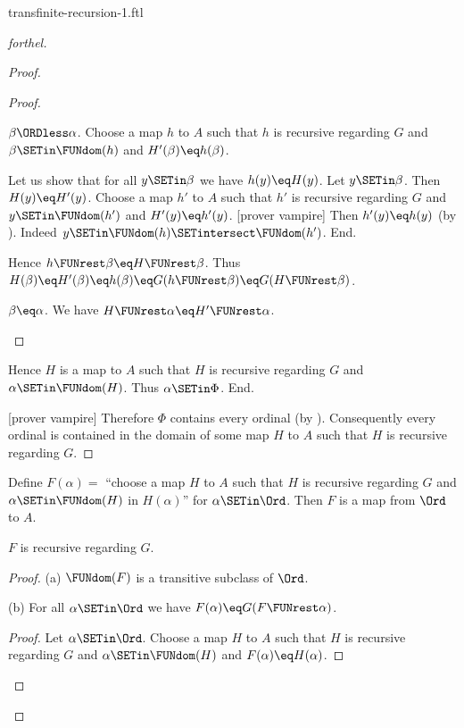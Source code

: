 \documentclass{naproche-library}
\begin{document}
\begin{smodule}[title=Transfinite Recursion I]{transfinite-recursion-1.ftl}
\begin{proof}[forthel]
\begin{proof}
\begin{proof}
        \begin{case}{$\beta \ORDless \alpha$.}
          Choose a map $h$ to $A$ such that $h$ is recursive regarding $G$ and $\beta \SETin \FUNdom(h)$ and $H'(\beta) \eq h(\beta)$.

          Let us show that for all $y \SETin \beta$ we have $h(y) \eq H(y)$.
            Let $y \SETin \beta$.
            Then $H(y) \eq H'(y)$.
            Choose a map $h'$ to $A$ such that $h'$ is recursive regarding $G$ and $y \SETin \FUNdom(h')$ and $H'(y) \eq h'(y)$.
            [prover vampire]
            Then $h'(y) \eq h(y)$ (by ).
            Indeed $y \SETin \FUNdom(h) \SETintersect \FUNdom(h')$.
          End.

          Hence $h \FUNrest \beta \eq H \FUNrest \beta$.
          Thus $H(\beta)
            \eq H'(\beta)
            \eq h(\beta)
            \eq G(h \FUNrest \beta)
            \eq G(H \FUNrest \beta)$.
        \end{case}

        \begin{case}{$\beta \eq \alpha$.}
          We have $H \FUNrest \alpha \eq H' \FUNrest \alpha$.
        \end{case}
      \end{proof}

      Hence $H$ is a map to $A$ such that $H$ is recursive regarding $G$ and $\alpha \SETin \FUNdom(H)$.
      Thus $\alpha \SETin \Phi$.
    End.

    [prover vampire]
    Therefore $\Phi$ contains every ordinal (by ).
    Consequently every ordinal is contained in the domain of some map $H$ to $A$ such that $H$ is recursive regarding $G$.
  \end{proof}

  Define $F(\alpha) =$ ``choose a map $H$ to $A$ such that $H$ is recursive regarding $G$ and $\alpha \SETin \FUNdom(H)$ in $H(\alpha)$'' for $\alpha \SETin \Ord$.
  Then $F$ is a map from $\Ord$ to $A$.

  $F$ is recursive regarding $G$.
  \begin{proof}
    (a) $\FUNdom(F)$ is a transitive subclass of $\Ord$.

    (b) For all $\alpha \SETin \Ord$ we have $F(\alpha) \eq G(F \FUNrest \alpha)$.
    \begin{proof}
      Let $\alpha \SETin \Ord$.
      Choose a map $H$ to $A$ such that $H$ is recursive regarding $G$ and $\alpha \SETin \FUNdom(H)$ and $F(\alpha) \eq H(\alpha)$.


\end{proof}
\end{proof}
\end{proof}
\end{smodule}
\end{document}
